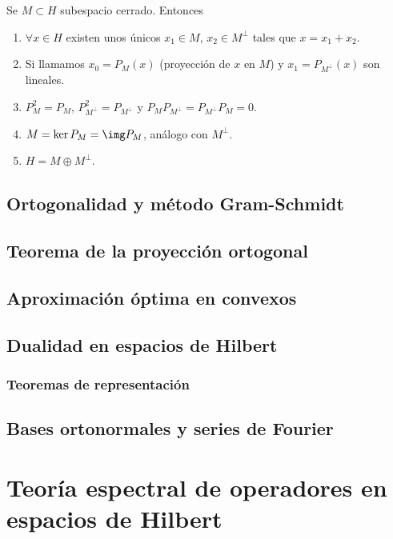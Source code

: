 \documentclass[palatino]{apuntes}
\begin{document}
\begin{prop} Se $M ⊂ H$ subespacio cerrado. Entonces \begin{enumerate}
\item $∀x ∈ H$ existen unos únicos $x_1 ∈ M$, $x_2 ∈ M^\perp$ tales que  $x = x_1 + x_2$.
\item Si llamamos $x_0 = P_M(x)$ (proyección  de $x$ en $M$) y $x_1 = P_{M^\perp}(x)$ son lineales.
\item $P_M^2 = P_M$, $P_{M^\perp}^2 = P_{M^\perp}$ y $P_MP_{M^\perp} = P_{M^\perp}P_M = 0$.
\item $M = \ker P_M = \img P_M$, análogo con $M^\perp$.
\item $H = M \oplus M^\perp$.
\end{enumerate}
\end{prop}

\section{Ortogonalidad y método Gram-Schmidt}

\section{Teorema de la proyección ortogonal}

\section{Aproximación óptima en convexos}

\section{Dualidad en espacios de Hilbert}

\subsection{Teoremas de representación}

\section{Bases ortonormales y series de Fourier}

\chapter{Teoría espectral de operadores en espacios de Hilbert}
\end{document}
